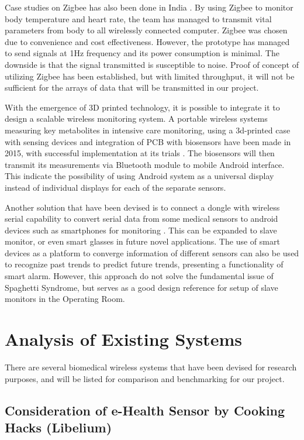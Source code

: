 Case studies on Zigbee has also been done in India \cite{lit6}. By using Zigbee to monitor body temperature and heart rate, the team has managed to transmit vital parameters from body to all wirelessly connected computer. Zigbee was chosen due to convenience and cost effectiveness. However, the prototype has managed to send signals at 1Hz frequency and its power consumption is minimal. The downside is that the signal transmitted is susceptible to noise. Proof of concept of utilizing Zigbee has been established, but with limited throughput, it will not be sufficient for the arrays of data that will be transmitted in our project. 
 
With the emergence of 3D printed technology, it is possible to integrate it to design a scalable wireless monitoring system. A portable wireless systems measuring key metabolites in intensive care monitoring, using a 3d-printed case with sensing devices and integration of PCB with biosensors have been made in 2015, with successful implementation at its trials \cite{lit7}. The biosensors will then transmit its measurements via Bluetooth module to mobile Android interface. This indicate the possibility of using Android system as a universal display instead of individual displays for each of the separate sensors. 

Another solution that have been devised is to connect a dongle with wireless serial capability to convert serial data from some medical sensors to android devices such as smartphones for monitoring \cite{lit8}. This can be expanded to slave monitor, or even smart glasses in future novel applications. The use of smart devices as a platform to converge information of different sensors can also be used to recognize past trends to predict future trends, presenting a functionality of smart alarm. However, this approach do not solve the fundamental issue of Spaghetti Syndrome, but serves as a good design reference for setup of slave monitors in the Operating Room.

\section{Analysis of Existing Systems}

There are several biomedical wireless systems that have been devised for research purposes, and will be listed for comparison and benchmarking for our project. 

\subsection{Consideration of e-Health Sensor by Cooking Hacks (Libelium)}

